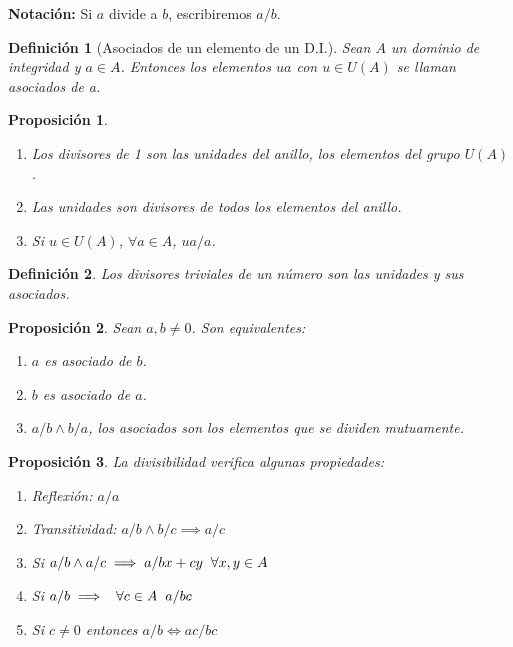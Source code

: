 \documentclass[11pt, a4paper, titlepage]{article}
\theoremstyle{theorem-style}
\newtheorem*{nprop}{Proposición}
\theoremstyle{definition-style}
\newtheorem*{ndef}{Definición}
\theoremstyle{remark-style}
\theoremstyle{example-style}
\newenvironment{nlist}
{\begin{enumerate}
\renewcommand\labelenumi{(\emph{\roman{enumi})}}}
{\end{enumerate}}
\begin{document}
\textbf{Notación:} Si $a$ divide a $b$, escribiremos $a/b$.

\begin{ndef}[Asociados de un elemento de un D.I.]
  Sean $A$ un dominio de integridad y $a\in A$. Entonces los elementos $ua$ con $u\in U(A)$ se llaman \emph{asociados de a}.
\end{ndef}

\begin{nprop}\hfill
  \begin{nlist}
  \item Los divisores de 1 son las unidades del anillo, los elementos del grupo $U(A)$.
  \item Las unidades son divisores de todos los elementos del anillo.
  \item Si $u\in U(A)$, $\forall a \in A$, $ua/a$.
    
  \end{nlist}
\end{nprop}

\begin{ndef}
	Los divisores triviales de un número son las unidades y sus asociados.
\end{ndef}

\begin{nprop}
	Sean $a,b\neq 0$. Son equivalentes:
	\begin{nlist}
	\item $a$ es asociado de $b$.
	\item $b$ es asociado de $a$.
	\item $a/b \wedge b/a$, los asociados son los elementos que se dividen mutuamente.
	
\end{nlist}
\end{nprop}

\begin{nprop} La divisibilidad verifica algunas propiedades:
  
  \begin{nlist}
  \item Reflexión: $a/a$
  \item Transitividad: $a/b \wedge b/c \implies a/c$
  \item Si $a/b \wedge a/c \implies a/bx +cy\hspace{0.2cm} \forall x,y \in A$ 
  \item Si $a/b \implies \hspace{0.2cm} \forall c\in A \hspace{0.2cm} a/bc$
  \item Si $c\neq 0$ entonces $a/b \iff ac/bc$
  \end{nlist}
\end{nprop}
\end{document}
